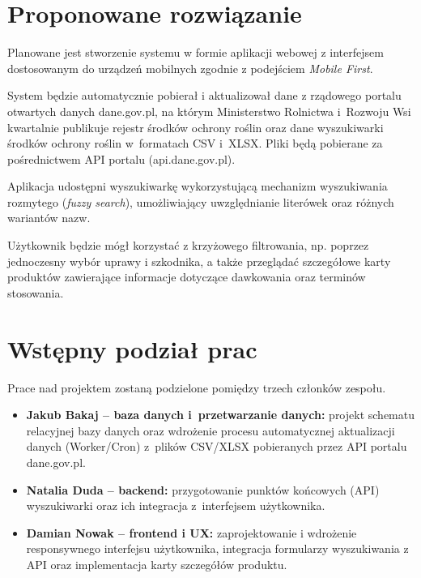 \documentclass[11pt,a4paper]{article}
\begin{document}
\section{Proponowane rozwiązanie}

Planowane jest stworzenie systemu w formie aplikacji webowej z interfejsem dostosowanym do urządzeń
mobilnych zgodnie z podejściem \emph{Mobile First}.

System będzie automatycznie pobierał i aktualizował dane z rządowego
portalu otwartych danych dane.gov.pl, na którym Ministerstwo Rolnictwa
i~Rozwoju Wsi kwartalnie publikuje rejestr środków ochrony roślin oraz dane
wyszukiwarki środków ochrony roślin w~formatach CSV i~XLSX. Pliki będą
pobierane za pośrednictwem API portalu (api.dane.gov.pl).

Aplikacja udostępni wyszukiwarkę wykorzystującą mechanizm
wyszukiwania rozmytego (\emph{fuzzy search}), umożliwiający
uwzględnianie literówek oraz różnych wariantów nazw.

Użytkownik będzie mógł korzystać z krzyżowego filtrowania, np.
poprzez jednoczesny wybór uprawy i szkodnika, a także przeglądać
szczegółowe karty produktów zawierające informacje dotyczące
dawkowania oraz terminów stosowania.





\newpage
\section{Wstępny podział prac}

Prace nad projektem zostaną podzielone pomiędzy trzech członków
zespołu.

\begin{itemize}

    \item
    \textbf{Jakub Bakaj -- baza danych i~przetwarzanie danych:}
    projekt schematu relacyjnej bazy danych oraz wdrożenie procesu
    automatycznej aktualizacji danych (Worker/Cron) z~plików CSV/XLSX
    pobieranych przez API portalu dane.gov.pl.

    \item
    \textbf{Natalia Duda -- backend:}
    przygotowanie punktów końcowych (API) wyszukiwarki oraz ich integracja
    z~interfejsem użytkownika.

    \item
    \textbf{Damian Nowak -- frontend i UX:}
    zaprojektowanie i wdrożenie responsywnego interfejsu
    użytkownika, integracja formularzy wyszukiwania z API oraz
    implementacja karty szczegółów produktu.

\end{itemize}
\end{document}
